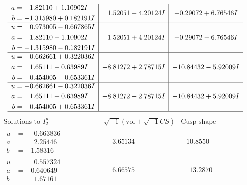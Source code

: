 \documentclass[1p]{elsarticle_modified}
\theoremstyle{definition}
\newcommand{\I}{\sqrt{-1}}
\begin{document}
$$\begin{array}{c|c|c}
\begin{aligned}
a &= \phantom{-}1.82110 + 1.10902 I \\
b &= -1.315980 + 0.182191 I\end{aligned}
 & \phantom{-}1.52051 - 4.20124 I & -0.29072 + 6.76546 I \\ \hline\begin{aligned}
u &= \phantom{-}0.973005 - 0.667865 I \\
a &= \phantom{-}1.82110 - 1.10902 I \\
b &= -1.315980 - 0.182191 I\end{aligned}
 & \phantom{-}1.52051 + 4.20124 I & -0.29072 - 6.76546 I \\ \hline\begin{aligned}
u &= -0.662661 + 0.322036 I \\
a &= \phantom{-}1.65111 - 0.63989 I \\
b &= \phantom{-}0.454005 - 0.653361 I\end{aligned}
 & -8.81272 + 2.78715 I & -10.84432 - 5.92009 I \\ \hline\begin{aligned}
u &= -0.662661 - 0.322036 I \\
a &= \phantom{-}1.65111 + 0.63989 I \\
b &= \phantom{-}0.454005 + 0.653361 I\end{aligned}
 & -8.81272 - 2.78715 I & -10.84432 + 5.92009 I\\
 \hline 
 \end{array}$$\newpage$$\begin{array}{c|c|c}  
\text{Solutions to }I^u_{2}& \I (\text{vol} + \sqrt{-1}CS) & \text{Cusp shape}\\
 \hline 
\begin{aligned}
u &= \phantom{-}0.663836\phantom{ +0.000000I} \\
a &= \phantom{-}2.25446\phantom{ +0.000000I} \\
b &= -1.58316\phantom{ +0.000000I}\end{aligned}
 & \phantom{-}3.65134\phantom{ +0.000000I} & -10.8550\phantom{ +0.000000I} \\ \hline\begin{aligned}
u &= \phantom{-}0.557324\phantom{ +0.000000I} \\
a &= -0.640649\phantom{ +0.000000I} \\
b &= \phantom{-}1.67161\phantom{ +0.000000I}\end{aligned}
 & \phantom{-}6.66575\phantom{ +0.000000I} & \phantom{-}13.2870\phantom{ +0.000000I} \\ \hline\begin{aligned}

\end{aligned}
\end{array}$$
\end{document}
